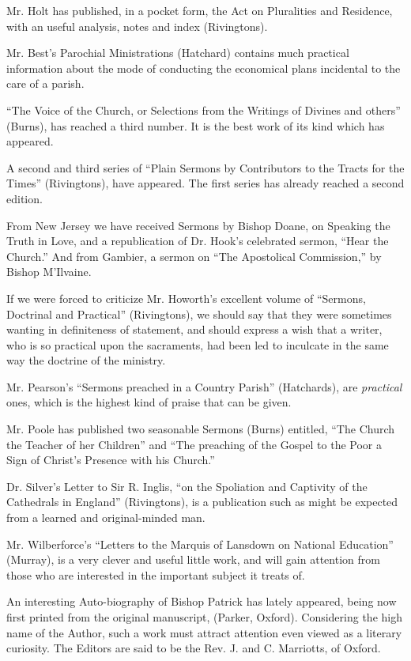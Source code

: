 Mr. Holt has published, in a pocket form, the Act
on Pluralities and Residence, with an useful analysis, notes and index (Rivingtons).

Mr. Best's Parochial Ministrations (Hatchard)
contains much practical information about the mode of conducting the
economical plans incidental to the care of a parish.

``The Voice of the Church, or Selections from the
Writings of Divines and others'' (Burns), has reached a third number. It
is the best work of its kind which has appeared.

A second and third series of ``Plain Sermons by
Contributors to the Tracts for the Times'' (Rivingtons), have appeared.
The first series has already reached a second edition.

From New Jersey we have received Sermons by Bishop
Doane, on Speaking the Truth in Love, and a republication of Dr. Hook's
celebrated sermon, ``Hear the Church.'' And from Gambier, a sermon on ``The
Apostolical Commission,'' by Bishop M'Ilvaine.

If we were forced to criticize Mr. Howorth's
excellent volume of ``Sermons, Doctrinal and Practical'' (Rivingtons), we
should say that they were sometimes wanting in definiteness of
statement, and should express a wish that a writer, who is so practical
upon the sacraments, had been led to inculcate in the same way the
doctrine of the ministry.

Mr. Pearson's ``Sermons preached in a Country Parish''
(Hatchards), are \emph{practical} ones, which is the highest kind of
praise that can be given.

Mr. Poole has published two seasonable Sermons
(Burns) entitled, ``The Church the Teacher of her Children'' and ``The
preaching of the Gospel to the Poor a Sign of Christ's Presence with his
Church.''

Dr. Silver's Letter to Sir R. Inglis, ``on the
Spoliation and Captivity of the Cathedrals in England'' (Rivingtons), is
a publication such as might be expected from a learned and
original-minded man.

Mr. Wilberforce's ``Letters to the Marquis of
Lansdown on National Education'' (Murray), is a very clever and useful
little work, and will gain attention from those who are interested in
the important subject it treats of.

An interesting Auto-biography of Bishop Patrick has
lately appeared, being now first printed from the original manuscript,
(Parker, Oxford). Considering the high name of the Author, such a work
must attract attention even viewed as a literary curiosity. The Editors
are said to be the Rev. J. and C. Marriotts, of Oxford.

